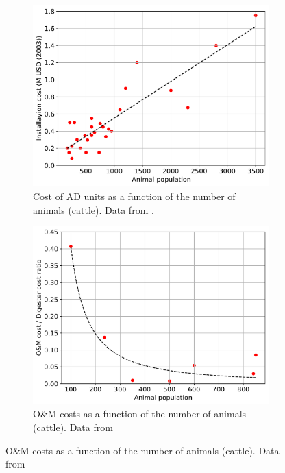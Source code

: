 \begin{refsection}[referencesCh4]
\begin{figure}[h!]
	\centering
	\begin{subfigure}[t]{0.7\textwidth}
		\includegraphics[width=\textwidth, trim={0cm 0cm 0cm 0cm},clip]{gfx/AppendixC/AD_size_cost}
		\caption{Cost of AD units as a function of the number of animals (cattle). Data from \citet{AgSTAR2003}.}
		\label{fig:AD_size_cost_AppC}
	\end{subfigure}
	\bigskip
	\begin{subfigure}[t]{0.75\textwidth}
		\includegraphics[width=\textwidth]{gfx/AppendixC/AD_size_OM_Unit_cost} 
		\caption{O\&M costs as a function of the number of animals (cattle). Data from \citet{USDA_OM}}
		\label{fig:AD_size_OM_Unit_cost_AppC}
	\end{subfigure}
	

\end{figure}
\end{refsection}
